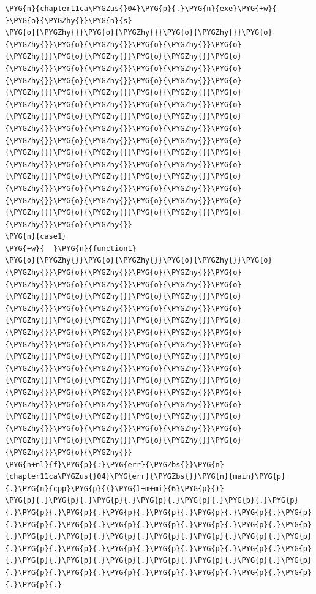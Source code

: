 \begin{itemize}
\begin{codeblockbg}
\begin{Verbatim}[commandchars=\\\{\},breaklines=true,breakanywhere=true,fontsize=\codefont,xleftmargin=17bp]
\PYG{n}{chapter11ca\PYGZus{}04}\PYG{p}{.}\PYG{n}{exe}\PYG{+w}{ }\PYG{o}{\PYGZhy{}}\PYG{n}{s}
\PYG{o}{\PYGZhy{}}\PYG{o}{\PYGZhy{}}\PYG{o}{\PYGZhy{}}\PYG{o}{\PYGZhy{}}\PYG{o}{\PYGZhy{}}\PYG{o}{\PYGZhy{}}\PYG{o}{\PYGZhy{}}\PYG{o}{\PYGZhy{}}\PYG{o}{\PYGZhy{}}\PYG{o}{\PYGZhy{}}\PYG{o}{\PYGZhy{}}\PYG{o}{\PYGZhy{}}\PYG{o}{\PYGZhy{}}\PYG{o}{\PYGZhy{}}\PYG{o}{\PYGZhy{}}\PYG{o}{\PYGZhy{}}\PYG{o}{\PYGZhy{}}\PYG{o}{\PYGZhy{}}\PYG{o}{\PYGZhy{}}\PYG{o}{\PYGZhy{}}\PYG{o}{\PYGZhy{}}\PYG{o}{\PYGZhy{}}\PYG{o}{\PYGZhy{}}\PYG{o}{\PYGZhy{}}\PYG{o}{\PYGZhy{}}\PYG{o}{\PYGZhy{}}\PYG{o}{\PYGZhy{}}\PYG{o}{\PYGZhy{}}\PYG{o}{\PYGZhy{}}\PYG{o}{\PYGZhy{}}\PYG{o}{\PYGZhy{}}\PYG{o}{\PYGZhy{}}\PYG{o}{\PYGZhy{}}\PYG{o}{\PYGZhy{}}\PYG{o}{\PYGZhy{}}\PYG{o}{\PYGZhy{}}\PYG{o}{\PYGZhy{}}\PYG{o}{\PYGZhy{}}\PYG{o}{\PYGZhy{}}\PYG{o}{\PYGZhy{}}\PYG{o}{\PYGZhy{}}\PYG{o}{\PYGZhy{}}\PYG{o}{\PYGZhy{}}\PYG{o}{\PYGZhy{}}\PYG{o}{\PYGZhy{}}\PYG{o}{\PYGZhy{}}\PYG{o}{\PYGZhy{}}\PYG{o}{\PYGZhy{}}\PYG{o}{\PYGZhy{}}\PYG{o}{\PYGZhy{}}
\PYG{n}{case1}
\PYG{+w}{  }\PYG{n}{function1}
\PYG{o}{\PYGZhy{}}\PYG{o}{\PYGZhy{}}\PYG{o}{\PYGZhy{}}\PYG{o}{\PYGZhy{}}\PYG{o}{\PYGZhy{}}\PYG{o}{\PYGZhy{}}\PYG{o}{\PYGZhy{}}\PYG{o}{\PYGZhy{}}\PYG{o}{\PYGZhy{}}\PYG{o}{\PYGZhy{}}\PYG{o}{\PYGZhy{}}\PYG{o}{\PYGZhy{}}\PYG{o}{\PYGZhy{}}\PYG{o}{\PYGZhy{}}\PYG{o}{\PYGZhy{}}\PYG{o}{\PYGZhy{}}\PYG{o}{\PYGZhy{}}\PYG{o}{\PYGZhy{}}\PYG{o}{\PYGZhy{}}\PYG{o}{\PYGZhy{}}\PYG{o}{\PYGZhy{}}\PYG{o}{\PYGZhy{}}\PYG{o}{\PYGZhy{}}\PYG{o}{\PYGZhy{}}\PYG{o}{\PYGZhy{}}\PYG{o}{\PYGZhy{}}\PYG{o}{\PYGZhy{}}\PYG{o}{\PYGZhy{}}\PYG{o}{\PYGZhy{}}\PYG{o}{\PYGZhy{}}\PYG{o}{\PYGZhy{}}\PYG{o}{\PYGZhy{}}\PYG{o}{\PYGZhy{}}\PYG{o}{\PYGZhy{}}\PYG{o}{\PYGZhy{}}\PYG{o}{\PYGZhy{}}\PYG{o}{\PYGZhy{}}\PYG{o}{\PYGZhy{}}\PYG{o}{\PYGZhy{}}\PYG{o}{\PYGZhy{}}\PYG{o}{\PYGZhy{}}\PYG{o}{\PYGZhy{}}\PYG{o}{\PYGZhy{}}\PYG{o}{\PYGZhy{}}\PYG{o}{\PYGZhy{}}\PYG{o}{\PYGZhy{}}\PYG{o}{\PYGZhy{}}\PYG{o}{\PYGZhy{}}\PYG{o}{\PYGZhy{}}\PYG{o}{\PYGZhy{}}
\PYG{n+nl}{f}\PYG{p}{:}\PYG{err}{\PYGZbs{}}\PYG{n}{chapter11ca\PYGZus{}04}\PYG{err}{\PYGZbs{}}\PYG{n}{main}\PYG{p}{.}\PYG{n}{cpp}\PYG{p}{(}\PYG{l+m+mi}{6}\PYG{p}{)}
\PYG{p}{.}\PYG{p}{.}\PYG{p}{.}\PYG{p}{.}\PYG{p}{.}\PYG{p}{.}\PYG{p}{.}\PYG{p}{.}\PYG{p}{.}\PYG{p}{.}\PYG{p}{.}\PYG{p}{.}\PYG{p}{.}\PYG{p}{.}\PYG{p}{.}\PYG{p}{.}\PYG{p}{.}\PYG{p}{.}\PYG{p}{.}\PYG{p}{.}\PYG{p}{.}\PYG{p}{.}\PYG{p}{.}\PYG{p}{.}\PYG{p}{.}\PYG{p}{.}\PYG{p}{.}\PYG{p}{.}\PYG{p}{.}\PYG{p}{.}\PYG{p}{.}\PYG{p}{.}\PYG{p}{.}\PYG{p}{.}\PYG{p}{.}\PYG{p}{.}\PYG{p}{.}\PYG{p}{.}\PYG{p}{.}\PYG{p}{.}\PYG{p}{.}\PYG{p}{.}\PYG{p}{.}\PYG{p}{.}\PYG{p}{.}\PYG{p}{.}\PYG{p}{.}\PYG{p}{.}\PYG{p}{.}\PYG{p}{.}

\end{Verbatim}
\end{codeblockbg}
\end{itemize}
